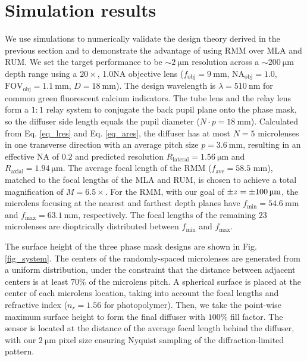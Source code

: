 \documentclass{osa-article}
\begin{document}
\section{Simulation results}
\label{section_simulation}
We use simulations to numerically validate the design theory derived in the previous section and to demonstrate the advantage of using RMM over MLA and RUM. We set the target performance to be $\sim \SI{2}{\micro\meter} $ resolution across a $\sim \SI{200}{\micro\meter} $ depth range using a $20\times$, 1.0NA objective lens ($f_\mathrm{obj}= \SI{9}{\milli\meter}$, $ \mathrm{NA_{obj}}=1.0$, $\mathrm{FOV_{obj}}=\SI{1.1}{\milli\meter}$, $D=\SI{18}{\milli\meter} $). The design wavelength is $\lambda = 510 \ \mathrm{nm}$ for common green fluorescent calcium indicators. The tube lens and the relay lens form a $1:1$ relay system to conjugate the back pupil plane onto the phase mask, so the diffuser side length equals the pupil diameter ($ N \cdot p =  \SI{18}{\milli\meter} $). Calculated from Eq. \ref{eq_lres} and Eq. \ref{eq_ares}, the diffuser has at most $N=5$ microlenses in one transverse direction with an average pitch size $p=\SI{3.6}{\milli\meter}$, resulting in an effective NA of $0.2$ and predicted resolution $R_\mathrm{lateral} = \SI{1.56}{\micro\meter}$ and $R_\mathrm{axial}=\SI{1.94}{\micro\meter}$. The average focal length of the RMM ($f_{\mathrm{ave}}= 58.5 $ mm), matched to the focal lengths of the MLA and RUM, is chosen to achieve a total magnification of $M=6.5 \times$.  For the RMM, with our goal of $\pm z = \SI{\pm 100}{\micro\meter}$, the microlens focusing at the nearest and farthest depth planes have $f_\mathrm{min}= \SI{54.6}{\milli\meter}$  and $f_\mathrm{max}= \SI{63.1}{\milli\meter}$, respectively. The focal lengths of the remaining $23$ microlenses are dioptrically distributed between $f_{\mathrm{min}}$ and $f_{\mathrm{max}}$. 

The surface height of the three phase mask designs are shown in Fig. \ref{fig_system}. The centers of the randomly-spaced microlenses are generated from a uniform distribution, under the constraint that the distance between adjacent centers is at least $70 \%$ of the microlens pitch. A spherical surface is placed at the center of each microlens location, taking into account the focal lengths and refractive index ($n_r = 1.56$ for photopolymer). Then, we take the point-wise maximum surface height to form the final diffuser with $100 \%$ fill factor. The sensor is located at the distance of the average focal length behind the diffuser, with our $\SI{2}{\micro\meter}$ pixel size ensuring Nyquist sampling of the diffraction-limited pattern. 
\end{document}
